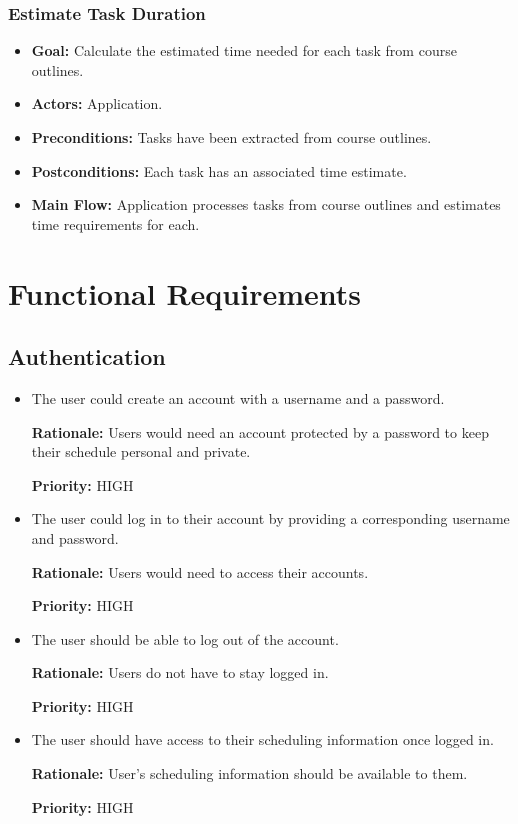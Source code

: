 \documentclass[12pt]{article}
\newcounter{reqnum} %
\newcommand{\rthereqnum}{FR\refstepcounter{reqnum}\thereqnum:}
\begin{document}
\subsubsection{Estimate Task Duration}
\begin{itemize}
    \item \textbf{Goal:} Calculate the estimated time needed for each task from course outlines.
    \item \textbf{Actors:} Application.
    \item \textbf{Preconditions:} Tasks have been extracted from course outlines.
    \item \textbf{Postconditions:} Each task has an associated time estimate.
    \item \textbf{Main Flow:} Application processes tasks from course outlines and estimates time requirements for each.
\end{itemize}


\section{Functional Requirements}
\subsection{Authentication}
\begin{itemize}[leftmargin=16.5mm,labelsep=4mm,label=\rthereqnum]

\item
The user could create an account with a username and a password.

\textbf{Rationale:} Users would need an account protected by a password to keep their schedule personal and private.

\textbf{Priority:} HIGH
\item
The user could log in to their account by providing a corresponding username and password.

\textbf{Rationale:} Users would need to access their accounts.

\textbf{Priority:} HIGH
\item
The user should be able to log out of the account.

\textbf{Rationale:} Users do not have to stay logged in.

\textbf{Priority:} HIGH
\item
The user should have access to their scheduling information once logged in.

\textbf{Rationale:} User's scheduling information should be available to them.

\textbf{Priority:} HIGH

\end{itemize}
\end{document}
